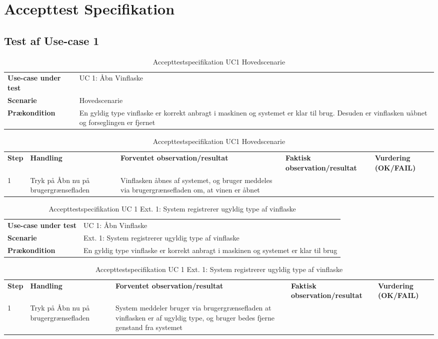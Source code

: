 \chapter{Accepttest Specifikation}
\section{Test af Use-case 1}
\begin{table}[H]
	\centering
	\caption{Accepttestspecifikation UC1 Hovedscenarie}
	\label{ATUC1:Hovedscenarie}
	\begin{tabular}{ p{80pt}  p{320pt} }\hline
		\rowcolor{white}	
		\textbf{Use-case under test} & UC 1: Åbn Vinflaske \\
		\rowcolor{lightgray}
		\textbf{Scenarie} & Hovedscenarie \\\rowcolor{white}	
		\textbf{Prækondition} &
		En gyldig type vinflaske er korrekt anbragt i maskinen og systemet er klar til brug. Desuden
		er vinflasken uåbnet og forseglingen er fjernet
 \\
		\hline
	\end{tabular}
	\begin{tabular}{  p{26pt} p{100pt}  p{101pt} | p{67pt} | p{68pt}}
		\textbf{Step} & \textbf{Handling} & \textbf{Forventet observation/resultat} & \textbf{Faktisk observation/resultat} & \textbf{Vurdering (OK/FAIL)}\\
		1 & Tryk på Åbn nu på
		brugergrænsefladen & Vinflasken åbnes af
		systemet, og bruger
		meddeles via
		brugergrænsefladen
		om, at vinen er åbnet &  &  \\
		\hline
	\end{tabular}
\end{table}

\begin{table}[H]
	\centering
	\caption{Accepttestspecifikation UC 1 Ext. 1: System registrerer ugyldig type af vinflaske}
	\label{ATUC1:Ext1}
	\begin{tabular}{ p{80pt}  p{320pt} }\hline
		\rowcolor{lightgray}	
		\textbf{Use-case under test} & UC 1: Åbn Vinflaske \\
		\rowcolor{white}
		\textbf{Scenarie} & Ext. 1: System registrerer ugyldig type af vinflaske \\\rowcolor{lightgray}	
		\textbf{Prækondition} &
		En gyldig type vinflaske er korrekt anbragt i maskinen og systemet er klar til brug \\
		\hline
	\end{tabular}
	\begin{tabular}{  p{26pt} p{100pt}  p{101pt} | p{67pt} | p{68pt}}
		\textbf{Step} & \textbf{Handling} & \textbf{Forventet observation/resultat} & \textbf{Faktisk observation/resultat} & \textbf{Vurdering (OK/FAIL)}\\
		1 & Tryk på Åbn nu på
		brugergrænsefladen & System meddeler bruger
		via brugergrænsefladen
		at vinflasken er af
		ugyldig type, og bruger
		bedes fjerne genstand
		fra systemet
 &  &  \\
		\hline
	\end{tabular}
\end{table}

